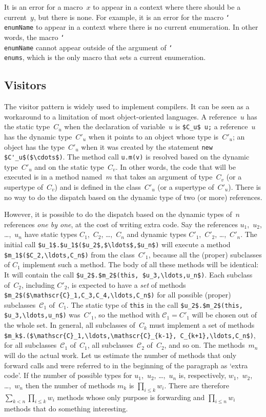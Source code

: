 \documentclass[a4paper]{article}
\newcommand{\jmlCode}{\lstinline[style=jml,basicstyle=\normalsize]}
\newcommand{\macro}[1]{\texttt{\char`\\#1}}
\theoremstyle{slanted}
\theoremstyle{definition}
\theoremstyle{remark}
\begin{document}
It is an error for a macro~$x$ to appear in a context where
there should be a current~$y$, but there is none. For example,
it is an error for the macro \macro{enumName} to appear in a
context where there is no current enumeration. In other words,
the macro \macro{enumName} cannot appear outside of the argument
of \macro{enums}, which is the only macro that sets a current
enumeration.


\subsection{Visitors}
\label{sec:visitors}

The visitor pattern is widely used to implement compilers. It can
be seen as a workaround to a limitation of most object-oriented
languages. A reference~$u$ has the static type~$C_u$ when the
declaration of variable~$u$ is \jmlCode|$C_u$ u;| a reference~$u$
has the dynamic type~$C'_u$ when it points to an object whose
type is~$C'_u$; an object has the type~$C'_u$ when it was created
by the statement \jmlCode|new $C'_u$($\cdots$)|. The method call
\jmlCode|u.m(v)| is resolved based on the dynamic type~$C'_u$
and on the static type~$C_v$. In other words, the code that will
be executed is in a method named~$m$ that takes an argument
of type~$C_v$ (or a supertype of~$C_v$) and is defined in the
class~$C'_u$ (or a supertype of~$C'_u$). There is no way to
do the dispatch based on the dynamic type of two (or more)
references.

However, it is possible to do the dispatch based on the
dynamic types of~$n$ references \emph{one by one}, at the
cost of writing extra code. Say the references $u_1$,~$u_2$,
\dots,~$u_n$ have static types $C_1$,~$C_2$, \dots,~$C_n$ and
dynamic types $C'_1$,~$C'_2$, \dots,~$C'_n$. The initial call
\jmlCode|$u_1$.$u_1$($u_2$,$\ldots$,$u_n$)| will execute a method
\jmlCode|$m_1$($C_2,\ldots,C_n$)| from the class~$C'_1$, because
all the (proper) subclasses of $C_1$ implement such a method. The
body of all these methods will be identical: It will contain the
call \jmlCode|$u_2$.$m_2$(this, $u_3,\ldots,u_n$)|. Each subclass
of~$C_2$, including $C'_2$, is expected to have a \emph{set}
of methods \jmlCode|$m_2$($\mathscr{C}_1,C_3,C_4,\ldots,C_n$)|
for all possible (proper) subclasses~$\mathscr{C}_1$
of~$C_1$. The static type of \jmlCode|this| in the call
\jmlCode|$u_2$.$m_2$(this, $u_3,\ldots,u_n$)| was~$C'_1$, so the
method with $\mathscr{C}_1=C'_1$ will be chosen out of the whole
set. In general, all subclasses of~$C_k$ must implement a set of
methods \jmlCode|$m_k$.($\mathscr{C}_1,\ldots,\mathscr{C}_{k-1},
C_{k+1},\ldots,C_n$)|, for all subclasses~$\mathscr{C}_1$
of~$C_1$, all subclasses~$\mathscr{C}_2$ of~$C_2$, and so on. The
methods~$m_n$ will do the actual work. Let us estimate the number
of methods that only forward calls and were referred to in the
beginning of the paragraph as `extra code'. If the number of
possible types for $u_1$,~$u_2$, \dots,~$u_n$ is, respectively,
$w_1$,~$w_2$, \dots,~$w_n$ then the number of methods $m_k$ is
$\prod_{i\le k} w_i$. There are therefore $\sum_{k<n}\prod_{i\le
k} w_i$ methods whose only purpose is forwarding and $\prod_{i\le
n} w_i$ methods that do something interesting.
\end{document}
